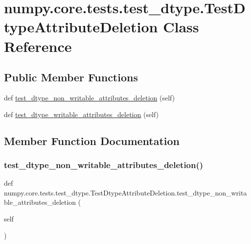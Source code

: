 \hypertarget{classnumpy_1_1core_1_1tests_1_1test__dtype_1_1TestDtypeAttributeDeletion}{}\section{numpy.\+core.\+tests.\+test\+\_\+dtype.\+Test\+Dtype\+Attribute\+Deletion Class Reference}
\label{classnumpy_1_1core_1_1tests_1_1test__dtype_1_1TestDtypeAttributeDeletion}
\subsection*{Public Member Functions}
\begin{DoxyCompactItemize}
\item 
def \hyperlink{classnumpy_1_1core_1_1tests_1_1test__dtype_1_1TestDtypeAttributeDeletion_a013b4bcaab795c46ca2c82b4fd9abba7}{test\+\_\+dtype\+\_\+non\+\_\+writable\+\_\+attributes\+\_\+deletion} (self)
\item 
def \hyperlink{classnumpy_1_1core_1_1tests_1_1test__dtype_1_1TestDtypeAttributeDeletion_ac1f271ff583819197bc295a2d1d8c7d0}{test\+\_\+dtype\+\_\+writable\+\_\+attributes\+\_\+deletion} (self)
\end{DoxyCompactItemize}


\subsection{Member Function Documentation}
\mbox{\label{classnumpy_1_1core_1_1tests_1_1test__dtype_1_1TestDtypeAttributeDeletion_a013b4bcaab795c46ca2c82b4fd9abba7}} 
\subsubsection{\texorpdfstring{test\+\_\+dtype\+\_\+non\+\_\+writable\+\_\+attributes\+\_\+deletion()}{test\_dtype\_non\_writable\_attributes\_deletion()}}
{\footnotesize\ttfamily def numpy.\+core.\+tests.\+test\+\_\+dtype.\+Test\+Dtype\+Attribute\+Deletion.\+test\+\_\+dtype\+\_\+non\+\_\+writable\+\_\+attributes\+\_\+deletion (\begin{DoxyParamCaption}\item[{}]{self }\end{DoxyParamCaption})}

